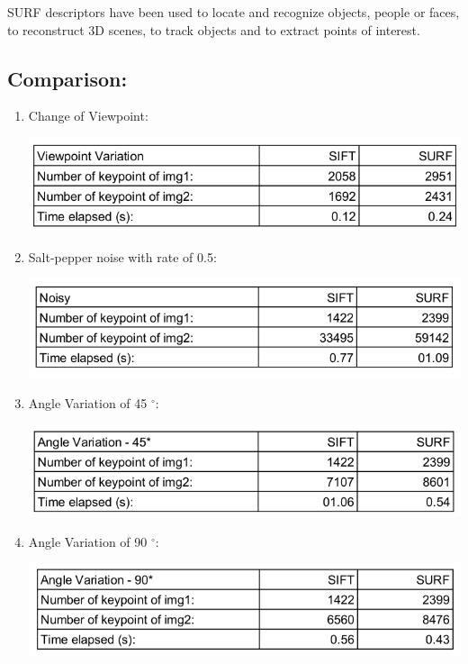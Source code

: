 SURF descriptors have been used to locate and recognize objects, people or faces, to reconstruct 3D scenes, to track objects and to extract points of interest.
\subsection{Comparison:}
\begin{enumerate}
\item Change of Viewpoint:
\begin{center}
\includegraphics[scale=0.3]{viewpoint.png}
\end{center}
\item Salt-pepper noise with rate of 0.5:
\begin{center}
\includegraphics[scale=0.3]{noisy.png}
\end{center}
\item Angle Variation of 45 $^{\circ}$:
\begin{center}
\includegraphics[scale=0.3]{angle-45.png}
\end{center}
\item Angle Variation of 90 $^{\circ}$:
\begin{center}
\includegraphics[scale=0.3]{angle-90.png}
\end{center}

\end{enumerate}
